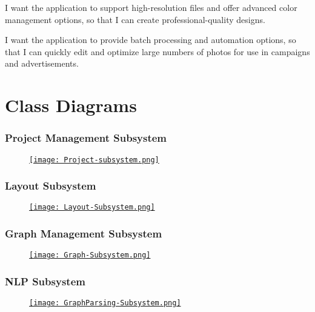\documentclass[11pt,a4paper]{article}
\begin{document}
I want the application to support high-resolution files and offer advanced color
management options, so that I can create professional-quality designs.

I want the application to provide batch processing and automation options, so
that I can quickly edit and optimize large numbers of photos for use in
campaigns and advertisements.

\pagebreak

\section*{Class Diagrams}

\subsubsection*{Project Management Subsystem}
\begin{figure}[htbp]
    \centering
    \href{https://drive.google.com/drive/u/2/folders/1rnYMSGTOmKY8_pOyJUIacjTxuubO_6NX}{\texttt{[image: Project-subsystem.png]}}
\end{figure}

\subsubsection*{Layout Subsystem}
\begin{figure}[htbp]
    \centering
      \href{https://drive.google.com/drive/u/2/folders/1rnYMSGTOmKY8_pOyJUIacjTxuubO_6NX}{\texttt{[image: Layout-Subsystem.png]}}
\end{figure}

\subsubsection*{Graph Management Subsystem}
\begin{figure}[htbp]
  \centering
  \href{https://drive.google.com/drive/u/2/folders/1rnYMSGTOmKY8_pOyJUIacjTxuubO_6NX}{\texttt{[image:  Graph-Subsystem.png]}}
\end{figure}


\subsubsection*{NLP Subsystem}
\begin{figure}[htbp]
    \centering
    \href{https://drive.google.com/drive/u/2/folders/1rnYMSGTOmKY8_pOyJUIacjTxuubO_6NX}{\texttt{[image:  GraphParsing-Subsystem.png]}}
\end{figure}
\end{document}
